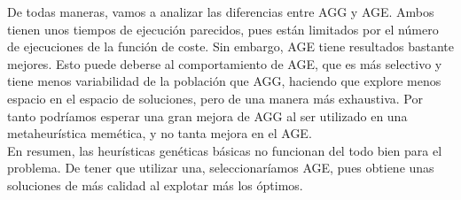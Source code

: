 De todas maneras, vamos a analizar las diferencias entre AGG y AGE. Ambos tienen unos tiempos de ejecución parecidos, pues están limitados por el número de ejecuciones de la función de coste. Sin embargo, AGE tiene resultados bastante mejores. Esto puede deberse al comportamiento de AGE, que es más selectivo y tiene menos variabilidad de la población que AGG, haciendo que explore menos espacio en el espacio de soluciones, pero de una manera más exhaustiva. Por tanto podríamos esperar una gran mejora de AGG al ser utilizado en una metaheurística memética, y no tanta mejora en el AGE.\\

En resumen, las heurísticas genéticas básicas no funcionan del todo bien para el problema. De tener que utilizar una, seleccionaríamos AGE, pues obtiene unas soluciones de más calidad al explotar más los óptimos.\\

\newpage

